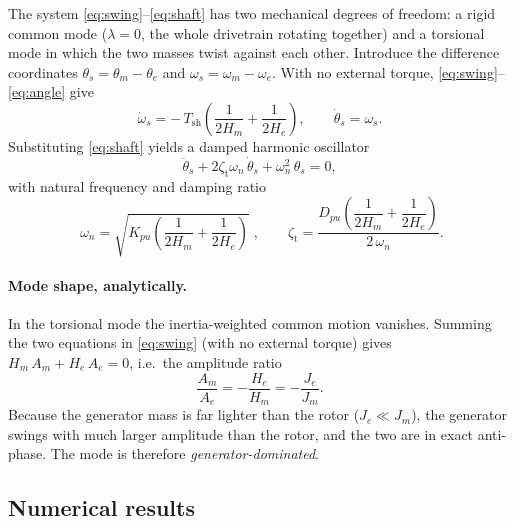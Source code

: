 The system \eqref{eq:swing}--\eqref{eq:shaft} has two mechanical degrees of
freedom: a rigid common mode ($\lambda = 0$, the whole drivetrain rotating
together) and a torsional mode in which the two masses twist against each
other. Introduce the difference coordinates $\theta_s = \theta_m-\theta_e$ and
$\omega_s = \omega_m-\omega_e$. With no external torque,
\eqref{eq:swing}--\eqref{eq:angle} give
\begin{equation}
  \dot{\omega}_s
  = -\,T_{\mathrm{sh}}\!\left(\frac{1}{2H_m} + \frac{1}{2H_e}\right),
  \qquad \dot{\theta}_s = \omega_s .
  \label{eq:diff}
\end{equation}
Substituting \eqref{eq:shaft} yields a damped harmonic oscillator
\begin{equation}
  \ddot{\theta}_s + 2\zeta_{\mathrm{t}}\omega_{n}\,\dot{\theta}_s
  + \omega_{n}^{2}\,\theta_s = 0,
  \label{eq:osc}
\end{equation}
with natural frequency and damping ratio
\begin{equation}
  \boxed{\;\omega_{n} = \sqrt{K_{pu}\!\left(\frac{1}{2H_m}+\frac{1}{2H_e}\right)}\;},
  \qquad
  \zeta_{\mathrm{t}}
  = \frac{D_{pu}\!\left(\dfrac{1}{2H_m}+\dfrac{1}{2H_e}\right)}{2\,\omega_{n}}.
  \label{eq:wn}
\end{equation}

\paragraph{Mode shape, analytically.}
In the torsional mode the inertia-weighted common motion vanishes. Summing the
two equations in \eqref{eq:swing} (with no external torque) gives
$H_m\,A_m + H_e\,A_e = 0$, i.e.\ the amplitude ratio
\begin{equation}
  \frac{A_m}{A_e} = -\frac{H_e}{H_m} = -\frac{J_e}{J_m}.
  \label{eq:ratio}
\end{equation}
Because the generator mass is far lighter than the rotor ($J_e \ll J_m$), the
generator swings with much larger amplitude than the rotor, and the two are in
exact anti-phase. The mode is therefore \emph{generator-dominated}.

\subsection{Numerical results}
\label{subsec:results}

